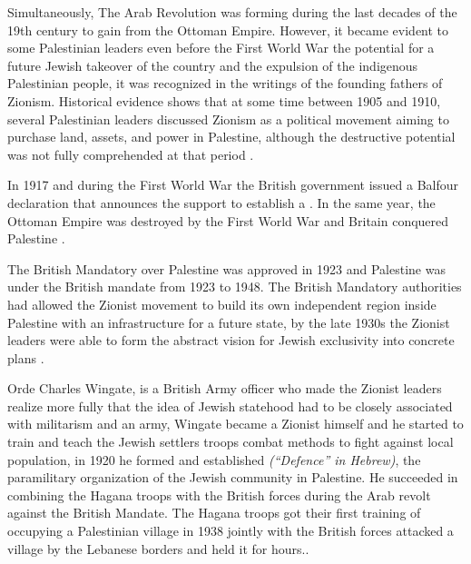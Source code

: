 Simultaneously, The Arab Revolution was forming during the last decades of the 19th century to gain  from the Ottoman Empire. However, it became evident to some Palestinian leaders even before the First World War the potential for a future Jewish takeover of the country and the expulsion of the indigenous Palestinian people, it was recognized in the writings of the founding fathers of Zionism. Historical evidence shows that at some time between 1905 and 1910, 
several Palestinian leaders discussed Zionism as a political movement 
aiming to purchase land, assets, and power in Palestine, although the 
destructive potential was not fully comprehended at that period \citep{Pappe2006}.



 In 1917 and during the First World War the British government issued a Balfour declaration that  announces the support to establish a . In the same year, the Ottoman Empire was destroyed by the First World War and Britain conquered Palestine \citep{Morris2004}.  
 
 
 
 
 
 The British Mandatory over Palestine was approved in 1923 and Palestine was under the British mandate from 1923 to 1948. The British Mandatory authorities had allowed the Zionist movement to build its own independent region inside Palestine with an infrastructure for a future state, by the late 1930s the Zionist leaders were able to form the abstract vision for Jewish exclusivity into concrete plans \citep{Pappe2006}.  
 
Orde Charles Wingate, is a British Army officer who made the Zionist leaders realize more fully that the idea of Jewish statehood had to be closely associated with militarism and an army, Wingate became a Zionist himself and he started to train and teach the Jewish settlers troops combat methods to fight against local population, in 1920 he formed and established  \textit{(“Defence” in Hebrew)}, the paramilitary organization of the Jewish community in Palestine. He succeeded in combining the Hagana troops with the British forces during the Arab revolt against the British Mandate. The Hagana troops got their first training of occupying a Palestinian village in 1938 jointly with the British forces attacked a village by the Lebanese borders and held it for hours\citep{Pappe2006}.\cite [p.112]{Fenby2018}. 

